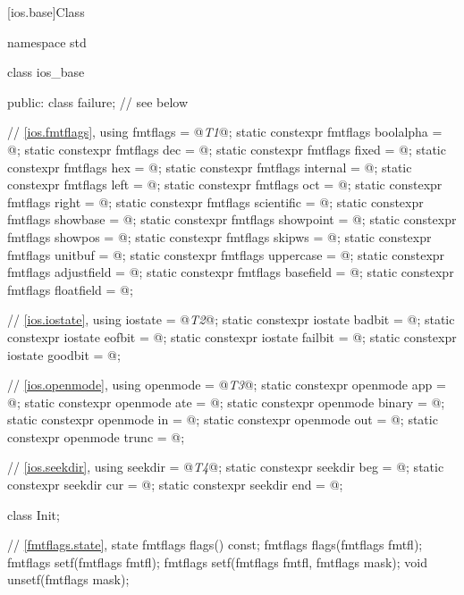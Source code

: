 [ios.base]{Class }
%
\begin{codeblock}
namespace std {
  class ios_base {
  public:
    class failure;              // see below

    // \ref{ios.fmtflags}, 
    using fmtflags = @\textit{T1}@;
    static constexpr fmtflags boolalpha = @\unspec@;
    static constexpr fmtflags dec = @\unspec@;
    static constexpr fmtflags fixed = @\unspec@;
    static constexpr fmtflags hex = @\unspec@;
    static constexpr fmtflags internal = @\unspec@;
    static constexpr fmtflags left = @\unspec@;
    static constexpr fmtflags oct = @\unspec@;
    static constexpr fmtflags right = @\unspec@;
    static constexpr fmtflags scientific = @\unspec@;
    static constexpr fmtflags showbase = @\unspec@;
    static constexpr fmtflags showpoint = @\unspec@;
    static constexpr fmtflags showpos = @\unspec@;
    static constexpr fmtflags skipws = @\unspec@;
    static constexpr fmtflags unitbuf = @\unspec@;
    static constexpr fmtflags uppercase = @\unspec@;
    static constexpr fmtflags adjustfield = @\seebelow@;
    static constexpr fmtflags basefield = @\seebelow@;
    static constexpr fmtflags floatfield = @\seebelow@;

    // \ref{ios.iostate}, 
    using iostate = @\textit{T2}@;
    static constexpr iostate badbit = @\unspec@;
    static constexpr iostate eofbit = @\unspec@;
    static constexpr iostate failbit = @\unspec@;
    static constexpr iostate goodbit = @\seebelow@;

    // \ref{ios.openmode}, 
    using openmode = @\textit{T3}@;
    static constexpr openmode app = @\unspec@;
    static constexpr openmode ate = @\unspec@;
    static constexpr openmode binary = @\unspec@;
    static constexpr openmode in = @\unspec@;
    static constexpr openmode out = @\unspec@;
    static constexpr openmode trunc = @\unspec@;

    // \ref{ios.seekdir}, 
    using seekdir = @\textit{T4}@;
    static constexpr seekdir beg = @\unspec@;
    static constexpr seekdir cur = @\unspec@;
    static constexpr seekdir end = @\unspec@;

    class Init;

    // \ref{fmtflags.state},  state
    fmtflags flags() const;
    fmtflags flags(fmtflags fmtfl);
    fmtflags setf(fmtflags fmtfl);
    fmtflags setf(fmtflags fmtfl, fmtflags mask);
    void unsetf(fmtflags mask);

}}
\end{codeblock}
